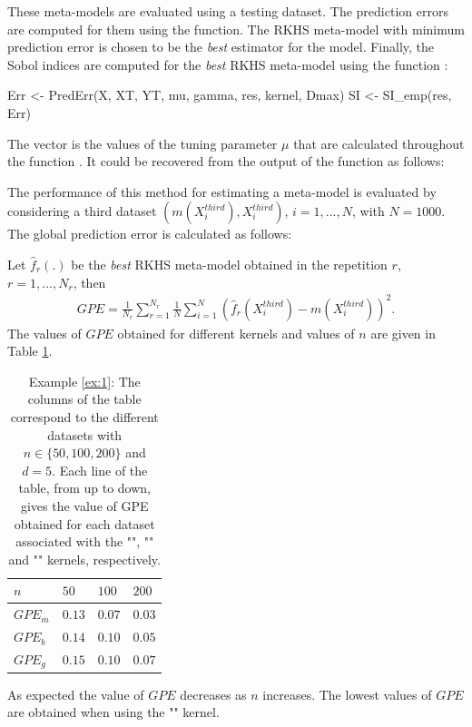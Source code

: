 These meta-models are evaluated using a testing dataset. The prediction errors are computed for them using the  function. The RKHS meta-model with minimum prediction error is chosen to be the \textit{best} estimator for the model. Finally, the Sobol indices are computed for the \textit{best} RKHS meta-model using the function :
\begin{example}
Err <- PredErr(X, XT, YT, mu, gamma, res, kernel, Dmax)
SI <- SI_emp(res, Err)
\end{example}
The vector  is the values of the tuning parameter $\mu$ that are calculated throughout the function . 
It could be recovered from the output of the  function as follows: 
The performance of this method for estimating a meta-model is evaluated by considering a third dataset $(m(X^{third}_i),X_i^{third})$, $i=1,...,N$, with $N=1000$. The global prediction error is calculated as follows:

Let $\widehat{f}_r(.)$ be the \textit{best} RKHS meta-model obtained in the repetition $r$, $r=1,...,N_r$, then
\begin{align*}
GPE=\frac{1}{N_{r}}\sum_{r=1}^{N_{r}}\frac{1}{N}\sum_{i=1}^N(\widehat{f}_r(X^{third}_i)-m(X^{third}_i))^2.
\end{align*}
The values of $GPE$ obtained for different kernels and values of $n$ are given in Table \ref{tab:errorex1}.
\begin{table}[h!]
\centering
\small{
{\setlength{\tabcolsep}{4pt}
\begin{tabular}{l|lll} 
$n$         & $50$     & $100$   & $200$ \\ \hline
$GPE_m$     & $0.13$   & $0.07$  & $0.03$ \\
$GPE_b$     & $0.14$   & $0.10$  & $0.05$ \\
$GPE_g$     & $0.15$   & $0.10$  & $0.07$ \\
\end{tabular}}}
\caption{Example \ref{ex:1}: The columns of the table correspond to the different datasets with $n\in\{50,100,200\}$ and $d=5$. Each line of the table, from up to down, gives the value of GPE obtained for each dataset associated with the "", "" and "" kernels, respectively.}
\label{tab:errorex1}
\end{table} 
As expected the value of $GPE$ decreases as $n$ increases. The lowest values of $GPE$ are obtained when using the "" kernel.

